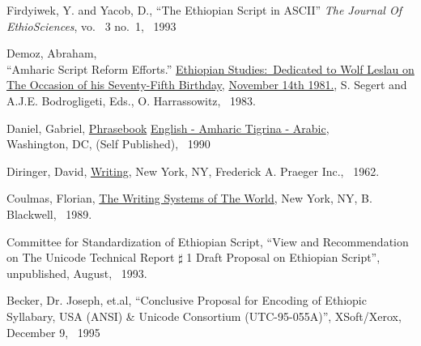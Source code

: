 
\begin{thebibliography}{2}

 Firdyiwek, Y. and Yacob, D., ``The Ethiopian Script in ASCII''
\emph{The Journal Of EthioSciences}, vo. ~3 no.~1, ~1993

 Demoz, Abraham, \\
``Amharic Script Reform Efforts.''  
\underline{Ethiopian Studies:\ Dedicated to Wolf Leslau on}
\underline{The Occasion of his
Seventy-Fifth Birthday,} \underline{November 14th 1981.}, 
S. Segert and A.J.E. Bodrogligeti, Eds., O. Harrassowitz, ~1983.

 Daniel, Gabriel, \underline{Phrasebook} 
\underline{English - Amharic Tigrina - Arabic}, \\
 Washington, DC, (Self Published), ~1990 

  Diringer, David, \underline{Writing}, New York, NY, 
     Frederick A. Praeger Inc., ~1962.

  Coulmas, Florian, \underline{The Writing Systems of The World}, New York, NY,
     B. Blackwell, ~1989.

  Committee for Standardization of Ethiopian Script, ``View and Recommendation
     on The Unicode Technical Report $\sharp$ 1 Draft Proposal on Ethiopian Script'',
     unpublished, August, ~1993.

 Becker, Dr. Joseph, et.al, ``Conclusive Proposal for Encoding of
Ethiopic Syllabary, USA (ANSI) \& Unicode Consortium (UTC-95-055A)'', XSoft/Xerox, December
9, ~1995
\end{thebibliography}
